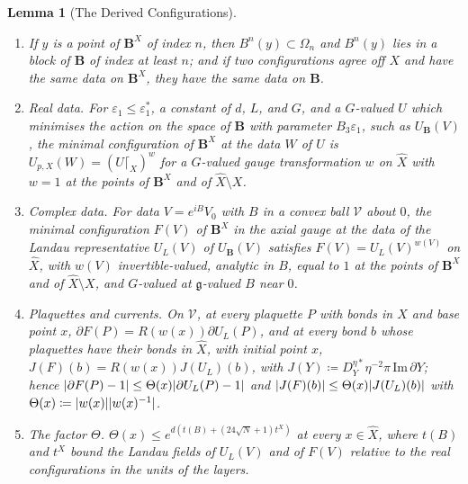 \documentclass[11pt]{preprint}
\DeclarePairedDelimiter{\abs}{\lvert}{\rvert}
\numberwithin{equation}{section}
\newtheorem{lemma}{Lemma}[section]
\theoremstyle{definition}
\theoremstyle{remark}
\theoremstyle{plain}
\begin{document}
\begin{lemma}[The Derived Configurations]\label{lem:derived-configs}
\begin{enumerate}[label=(\alph*)]
\item If $y$ is a point of $\mathbf B^X$ of index $n$, then $B^n(y) \subset \Omega_n$ and $B^n(y)$ lies in a block of $\mathbf B$ of index at least $n$; and if two configurations agree off $X$ and have the same data on $\mathbf B^X$, they have the same data on $\mathbf B$.
\item \emph{Real data.} For $\varepsilon_1 \leq \varepsilon_1^*$, a constant of $d$, $L$, and $G$, and a $G$-valued $U$ which minimises the action on the space of $\mathbf B$ \cite[(6)]{BalabanVAR} with parameter $B_3\varepsilon_1$, such as $U_{\mathbf B}(V)$, the minimal configuration of $\mathbf B^X$ at the data $W$ of $U$ is $U_{p,X}(W) = (U\lceil_X)^w$ for a $G$-valued gauge transformation $w$ on $\hat X$ with $w = 1$ at the points of $\mathbf B^X$ and of $\hat X \setminus X$.
\item \emph{Complex data.} For data $V = e^{iB}V_0$ with $B$ in a convex ball $\mathcal V$ about $0$, the minimal configuration $F(V)$ of $\mathbf B^X$ in the axial gauge at the data of the Landau representative $U_L(V)$ of $U_{\mathbf B}(V)$ satisfies $F(V) = U_L(V)^{w(V)}$ on $\hat X$, with $w(V)$ invertible-valued, analytic in $B$, equal to $1$ at the points of $\mathbf B^X$ and of $\hat X \setminus X$, and $G$-valued at $\mathfrak g$-valued $B$ near $0$.
\item \emph{Plaquettes and currents.} On $\mathcal V$, at every plaquette $P$ with bonds in $\hat X$ and base point $x$, $\partial F(P) = R(w(x))\partial U_L(P)$, and at every bond $b$ whose plaquettes have their bonds in $\hat X$, with initial point $x$, $J(F)(b) = R(w(x))J(U_L)(b)$, with $J(Y) \coloneqq D^{\eta*}_Y\eta^{-2}\pi\,\mathrm{Im}\,\partial Y$; hence $\abs{\partial F(P) - 1} \leq \Theta(x)\abs{\partial U_L(P) - 1}$ and $\abs{J(F)(b)} \leq \Theta(x)\abs{J(U_L)(b)}$ with $\Theta(x) \coloneqq \abs{w(x)}\abs{w(x)^{-1}}$.
\item \emph{The factor $\Theta$.} $\Theta(x) \leq e^{d(t(B) + (24\sqrt N + 1)t^X)}$ at every $x \in \hat X$, where $t(B)$ and $t^X$ bound the Landau fields of $U_L(V)$ and of $F(V)$ relative to the real configurations in the units of the layers.
\end{enumerate}
\end{lemma}
\end{document}
